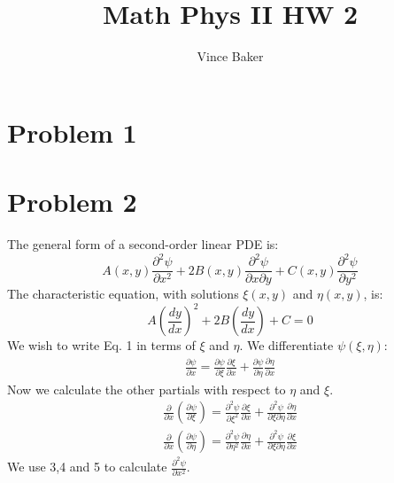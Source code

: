 \documentclass[a4paper,10pt]{article}
\title{Math Phys II HW 2}
\author{Vince Baker}
\begin{document}
\maketitle

\begin{abstract}

\end{abstract}

\section{Problem 1}

\section{Problem 2}
The general form of a second-order linear PDE is:
\begin{equation}
 A(x,y)\frac{\partial ^2 \psi}{\partial x^2}+2B(x,y)\frac{\partial ^2\psi}{\partial x \partial y}+C(x,y)\frac{\partial ^2 \psi}{\partial y^2}
\end{equation}
The characteristic equation,  with solutions $\xi(x,y)$ and $\eta(x,y)$, is:
\begin{equation}
 A(\frac{dy}{dx})^2+2B(\frac{dy}{dx})+C=0
\end{equation}
We wish to write Eq. 1 in terms of $\xi$ and $\eta$. We differentiate $\psi(\xi, \eta)$:
\begin{gather}
\frac{\partial \psi}{\partial x}=\frac{\partial \psi}{\partial \xi}\frac{\partial \xi}{\partial x}+\frac{\partial \psi}{\partial \eta}\frac{\partial \eta}{\partial x}
\end{gather}
Now we calculate the other partials with respect to $\eta$ and $\xi$.
\begin{gather}
\frac{\partial}{\partial x}(\frac{\partial \psi}{\partial \xi})=\frac{\partial ^2 \psi}{\partial \xi^2}\frac{\partial \xi}{\partial x}+
\frac{\partial ^2 \psi}{\partial \xi \partial \eta}\frac{\partial \eta}{\partial x}\\
\frac{\partial}{\partial x}(\frac{\partial \psi}{\partial \eta})=\frac{\partial ^2 \psi}{\partial \eta^2}\frac{\partial \eta}{\partial x}+
\frac{\partial ^2 \psi}{\partial \xi \partial \eta}\frac{\partial \xi}{\partial x}
\end{gather}
We use 3,4 and 5 to calculate $\frac{\partial ^2 \psi}{\partial x^2}$.
\end{document}
